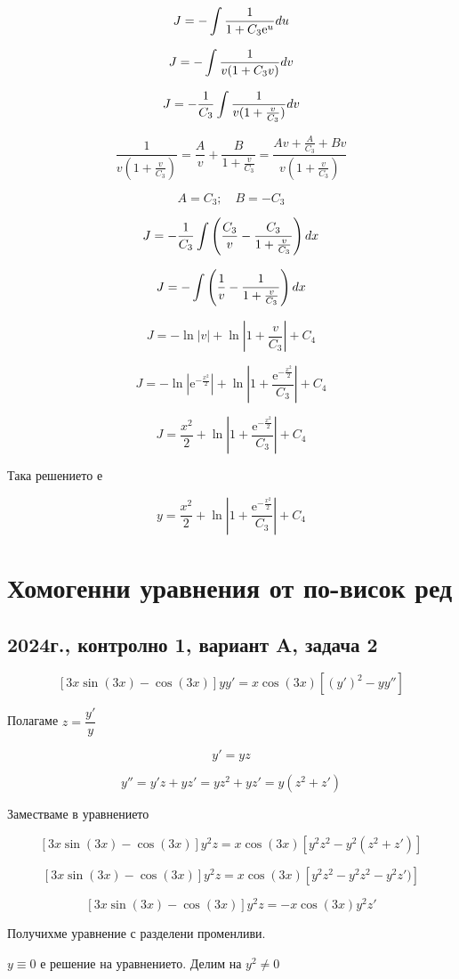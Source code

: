 \documentclass{scrartcl}
\begin{document}
$$J = -\int\dfrac{1}{1+C_3\mathrm{e}^{u}}\space du$$

$$J = -\int\dfrac{1}{v(1+C_3v)}\space dv$$

$$J = -\dfrac{1}{C_3}\int\dfrac{1}{v(1+\frac{v}{C_3})}\space dv$$

$$\dfrac{1}{v(1+\frac{v}{C_3})} = \dfrac{A}{v} + \dfrac{B}{1+\frac{v}{C_3}} = \dfrac{Av+\frac{A}{C_3}+Bv}{v(1+\frac{v}{C_3})}$$

$$A = C_3; \quad B=-C_3$$

$$J = -\dfrac{1}{C_3}\int\left(\dfrac{C_3}{v}-\dfrac{C_3}{1+\frac{v}{C_3}}\right)\space dx$$

$$J = -\int\left(\dfrac{1}{v}-\dfrac{1}{1+\frac{v}{C_3}}\right)\space dx$$

$$J = -\ln{|v|}+\ln{|1+\frac{v}{C_3}|} + C_4$$

$$J = -\ln{|\mathrm{e}^{-\frac{x^2}{2}}|}+\ln{|1+\frac{\mathrm{e}^{-\frac{x^2}{2}}}{C_3}|} + C_4$$

$$J = \frac{x^2}{2}+\ln{|1+\frac{\mathrm{e}^{-\frac{x^2}{2}}}{C_3}|} + C_4$$

Така решението е

$$y = \frac{x^2}{2}+\ln{|1+\frac{\mathrm{e}^{-\frac{x^2}{2}}}{C_3}|} + C_4$$

\section{Хомогенни уравнения от по-висок ред}

\subsection{2024г., контролно 1, вариант A, задача 2}

$$[3x\sin(3x)-\cos(3x)]yy' = x\cos(3x) [(y')^2-yy'']$$

Полагаме $z = \dfrac{y'}{y}$

$$y' = yz$$

$$y'' = y'z+yz'=yz^2+yz'=y(z^2+z')$$

Заместваме в уравнението

$$[3x\sin(3x)-\cos(3x)]y^2z = x\cos(3x) [y^2z^2-y^2(z^2+z')]$$

$$[3x\sin(3x)-\cos(3x)]y^2z = x\cos(3x) [y^2z^2-y^2z^2-y^2z')]$$

$$[3x\sin(3x)-\cos(3x)]y^2z = -x\cos(3x) y^2z'$$

Получихме уравнение с разделени променливи.

$y\equiv 0$ е решение на уравнението. Делим на $y^2\ne 0$
\end{document}
